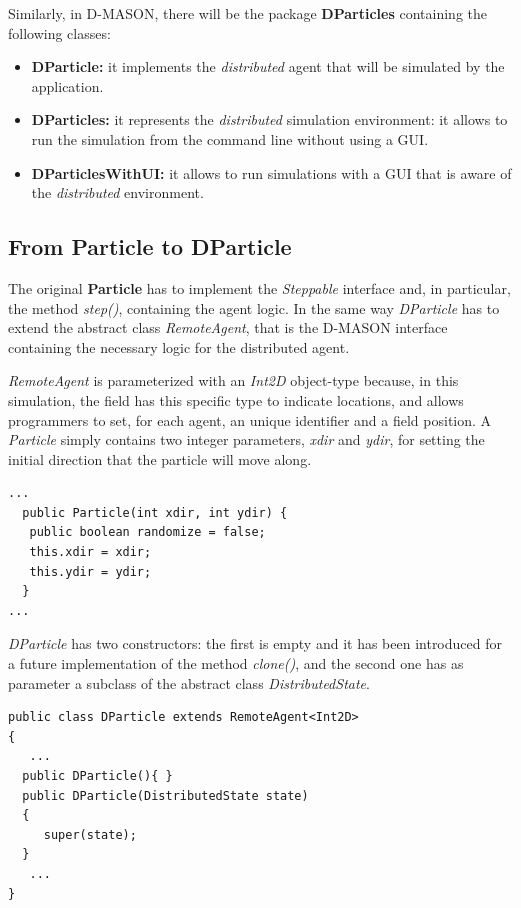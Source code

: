 \documentclass[12pt]{article}
\begin{document}
Similarly, in D-MASON, there will be the package \textbf{DParticles} containing the following classes:

\begin{itemize}
	\item \textbf{DParticle:} it implements the \textit{distributed} agent that will be simulated by the application.
	\item \textbf{DParticles:} it represents the \textit{distributed} simulation environment: it allows to run the simulation from the command line without using a GUI.
	\item \textbf{DParticlesWithUI:} it allows to run simulations with a GUI that is aware of the \textit{distributed} environment.
\end{itemize}

\subsection{From Particle to DParticle}
The original \textbf{Particle} has to implement the \textit{Steppable} interface and, in particular, the method \textit{step()}, containing the agent logic. In the same way \textit{DParticle} has to extend the abstract class \textit{RemoteAgent}, that is the D-MASON interface containing the necessary logic for the distributed agent. 

\textit{RemoteAgent} is parameterized with an \textit{Int2D} object-type because, in this simulation, the field has this specific type to indicate locations, and allows programmers to set, for each agent, an unique identifier and a field position.
A \textit{Particle} simply contains two integer parameters, \textit{xdir} and \textit{ydir}, for setting the initial direction that the particle will move along.

\begin{lstlisting}
...
  public Particle(int xdir, int ydir) {
   public boolean randomize = false;
   this.xdir = xdir;
   this.ydir = ydir;
  }
...
\end{lstlisting}
\medskip

\textit{DParticle} has two constructors: the first is empty and it has been introduced for a future implementation of the method \textit{clone()}, and the second one has as parameter a subclass of the abstract class \textit{DistributedState}.

\begin{lstlisting}
public class DParticle extends RemoteAgent<Int2D>
{
   ...
  public DParticle(){ }
  public DParticle(DistributedState state)
  {
     super(state);
  }
   ...
}
\end{lstlisting}
\end{document}

